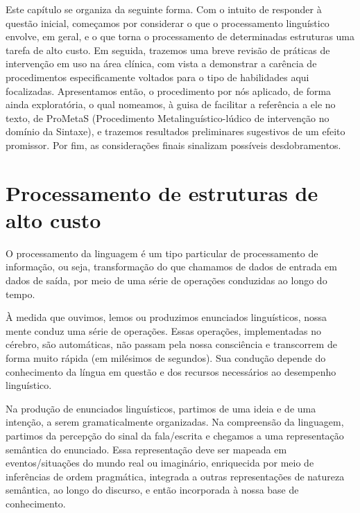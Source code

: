 \documentclass[output=paper,colorlinks,citecolor=brown,booklanguage=portuguese]{langscibook}
\begin{document}
Este capítulo se organiza da seguinte forma. Com o intuito de responder à questão inicial, começamos por considerar o que o processamento linguístico envolve, em geral, e o que torna o processamento de determinadas estruturas uma tarefa de alto custo. Em seguida, trazemos uma breve revisão de práticas de intervenção em uso na área clínica, com vista a demonstrar a carência de procedimentos especificamente voltados para o tipo de habilidades aqui focalizadas. Apresentamos então, o procedimento por nós aplicado, de forma ainda exploratória, o qual nomeamos, à guisa de facilitar a referência a ele no texto, de ProMetaS (Procedimento Metalinguístico-lúdico de intervenção no domínio da Sintaxe), e trazemos resultados preliminares sugestivos de um efeito promissor. Por fim, as considerações finais sinalizam possíveis desdobramentos.  

\section{Processamento de estruturas de alto custo}
\largerpage[-2]
O processamento da linguagem é um tipo particular de processamento de informação, ou seja, transformação do que chamamos de dados de entrada em dados de saída, por meio de uma série de operações conduzidas ao longo do tempo. 

À medida que ouvimos, lemos ou produzimos enunciados linguísticos, nossa mente conduz uma série de operações. Essas operações, implementadas no cérebro, são automáticas, não passam pela nossa consciência e transcorrem de forma muito rápida (em milésimos de segundos). Sua condução depende do conhecimento da língua em questão e dos recursos necessários ao desempenho linguístico. 

Na produção de enunciados linguísticos, partimos de uma ideia e de uma intenção, a serem gramaticalmente organizadas. Na compreensão da linguagem, partimos da percepção do sinal da fala/escrita e chegamos a uma representação semântica do enunciado. Essa representação deve ser mapeada em eventos/situações do mundo real ou imaginário, enriquecida por meio de inferências de ordem pragmática, integrada a outras representações de natureza semântica, ao longo do discurso, e então incorporada à nossa base de conhecimento. 
\end{document}
